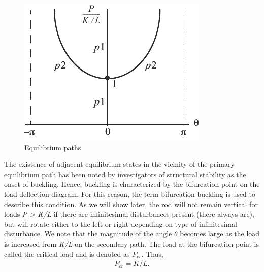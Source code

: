 \documentclass{AeroStructure-ERJohnson}
\begin{document}
\begin{figure}
\includegraphics{Figure_10-2.pdf}
\caption{Equilibrium paths\label{fig10.2}}
\end{figure}

The existence of adjacent equilibrium states in the vicinity of the primary equilibrium path has been noted by investigators of structural stability as the onset of buckling. Hence, buckling is characterized by the bifurcation point on the load-deflection diagram. For this reason, the term bifurcation buckling is used to describe this condition. As we will show later, the rod will not remain vertical for loads \textit{P > K/L} if there are infinitesimal disturbances present (there always are), but will rotate either to the left or right depending on type of infinitesimal disturbance. We note that the magnitude of the angle $\theta$ becomes large as the load is increased from \textit{K/L} on the secondary path. The load at the bifurcation point is called the critical load and is denoted as $P_{{cr}}$. Thus,\vspace*{-3pt}
\begin{align}\label{eq10.5}
P_{c r}=K / L.
\end{align}

\vspace*{-6pt}
\end{document}
